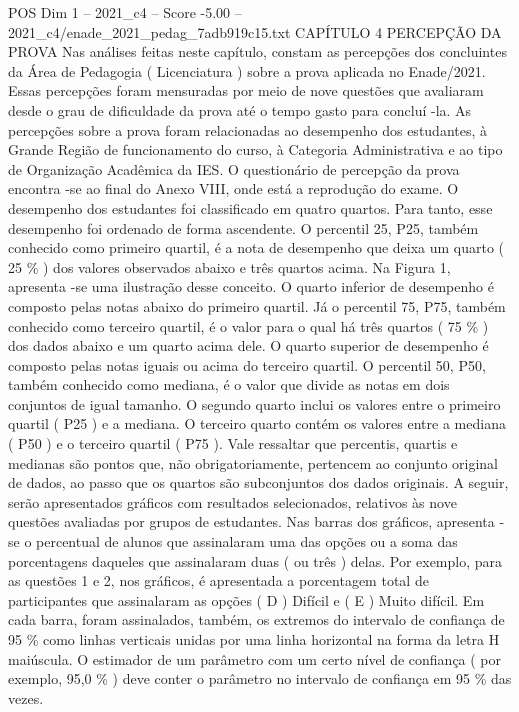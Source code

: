 \begin{textsample}{POS Dim 1 – 2021\_c4 – Score -5.00 – 2021\_c4/enade\_2021\_pedag\_7adb919c15.txt}  \label{ex:f1_pos_379}
CAPÍTULO 4 PERCEPÇÃO DA PROVA Nas análises feitas neste capítulo, constam as percepções dos concluintes da Área de Pedagogia ( Licenciatura ) sobre a prova aplicada no Enade/2021.
Essas percepções foram mensuradas por meio de nove questões que avaliaram desde o grau de dificuldade da prova até o tempo gasto para concluí -la.
As percepções sobre a prova foram relacionadas ao desempenho dos estudantes, à Grande Região de funcionamento do curso, à Categoria Administrativa e ao tipo de Organização Acadêmica da IES.
O questionário de percepção da prova encontra -se ao final do Anexo VIII, onde está a reprodução do exame.
O desempenho dos estudantes foi classificado em quatro quartos.
Para tanto, esse desempenho foi ordenado de forma ascendente.
O percentil 25, P25, também conhecido como primeiro quartil, é a nota de desempenho que deixa um quarto ( 25 \% ) dos valores observados abaixo e três quartos acima.
Na Figura 1, apresenta -se uma ilustração desse conceito.
O quarto inferior de desempenho é composto pelas notas abaixo do primeiro quartil.
Já o percentil 75, P75, também conhecido como terceiro quartil, é o valor para o qual há três quartos ( 75 \% ) dos dados abaixo e um quarto acima dele.
O quarto superior de desempenho é composto pelas notas iguais ou acima do terceiro quartil.
O percentil 50, P50, também conhecido como mediana, é o valor que divide as notas em dois conjuntos de igual tamanho.
O segundo quarto inclui os valores entre o primeiro quartil ( P25 ) e a mediana.
O terceiro quarto contém os valores entre a mediana ( P50 ) e o terceiro quartil ( P75 ).
Vale ressaltar que percentis, quartis e medianas são pontos que, não obrigatoriamente, pertencem ao conjunto original de dados, ao passo que os quartos são subconjuntos dos dados originais.
A seguir, serão apresentados gráficos com resultados selecionados, relativos às nove questões avaliadas por grupos de estudantes.
Nas barras dos gráficos, apresenta -se o percentual de alunos que assinalaram uma das opções ou a soma das porcentagens daqueles que assinalaram duas ( ou três ) delas.
Por exemplo, para as questões 1 e 2, nos gráficos, é apresentada a porcentagem total de participantes que assinalaram as opções ( D ) Difícil e ( E ) Muito difícil.
Em cada barra, foram assinalados, também, os extremos do intervalo de confiança de 95 \% como linhas verticais unidas por uma linha horizontal na forma da letra H maiúscula.
O estimador de um parâmetro com um certo nível de confiança ( por exemplo, 95,0 \% ) deve conter o parâmetro no intervalo de confiança em 95 \% das vezes.

\end{textsample}
